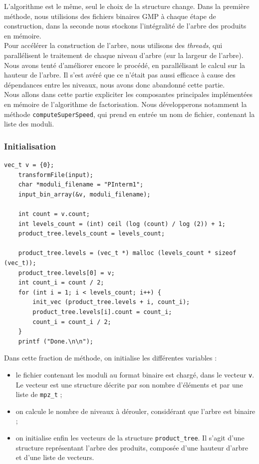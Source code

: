 L'algorithme est le même, seul le choix de la structure change.
Dans la première méthode, nous utilisions des fichiers binaires GMP à chaque étape de construction, dans la seconde nous stockons l'intégralité de l'arbre des produits en mémoire.\\


Pour accélérer la construction de l'arbre, nous utilisons des \textit{threads}, qui parallélisent le traitement de chaque niveau d'arbre (sur la largeur de l'arbre).
Nous avons tenté d'améliorer encore le procédé, en parallélisant le calcul sur la hauteur de l'arbre. Il s'est avéré que ce n'était pas aussi efficace à cause des dépendances entre les niveaux, nous avons donc abandonné cette partie.\\


Nous allons dans cette partie expliciter les composantes principales implémentées en mémoire de l'algorithme de factorisation. Nous développerons notamment la méthode \texttt{computeSuperSpeed}, qui prend en entrée un nom de fichier, contenant la liste des moduli. 


\subsubsection{Initialisation}

\begin{lstlisting}[style=customc,caption=fact\_superspeed.c - partie 1, label=fact1]
	vec_t v = {0};
	transformFile(input);
	char *moduli_filename = "PInterm1";
	input_bin_array(&v, moduli_filename);
	
	int count = v.count;
	int levels_count = (int) ceil (log (count) / log (2)) + 1;
	product_tree.levels_count = levels_count;
	
	product_tree.levels = (vec_t *) malloc (levels_count * sizeof (vec_t));
	product_tree.levels[0] = v;
	int count_i = count / 2;
	for (int i = 1; i < levels_count; i++) {
		init_vec (product_tree.levels + i, count_i);
		product_tree.levels[i].count = count_i;
		count_i = count_i / 2;
	}
	printf ("Done.\n\n");
\end{lstlisting}

Dans cette fraction de méthode, on initialise les différentes variables :
\begin{itemize}
	\item le fichier contenant les moduli au format binaire est chargé, dans le vecteur \texttt{v}. Le vecteur est une structure décrite par son nombre d'éléments et par une liste de \texttt{mpz\_t} ;
	\item on calcule le nombre de niveaux à dérouler, considérant que l'arbre est binaire ;
	\item on initialise enfin les vecteurs de la structure \texttt{product\_tree}. Il s'agit d'une structure représentant l'arbre des produits, composée d'une hauteur d'arbre et d'une liste de vecteurs.
\end{itemize}



